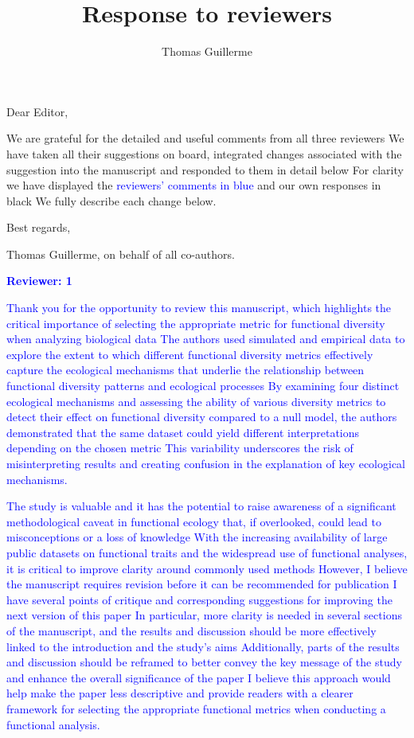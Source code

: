 \documentclass[
]{article}
\title{Response to reviewers}
\author{Thomas Guillerme}
\begin{document}
\maketitle


Dear Editor,

We are grateful for the detailed and useful comments from all three reviewers
We have taken all their suggestions on board, integrated changes associated with the suggestion into the manuscript and responded to them in detail below
For clarity we have displayed the \textcolor{blue}{reviewers' comments in blue} and our own responses in black
We fully describe each change below.

Best regards,

Thomas Guillerme, on behalf of all co-authors.

\textcolor{blue}{\textbf{Reviewer: 1}}

\textcolor{blue}{Thank you for the opportunity to review this manuscript, which highlights the critical importance of selecting the appropriate metric for functional diversity when analyzing biological data
The authors used simulated and empirical data to explore the extent to which different functional diversity metrics effectively capture the ecological mechanisms that underlie the relationship between functional diversity patterns and ecological processes
By examining four distinct ecological mechanisms and assessing the ability of various diversity metrics to detect their effect on functional diversity compared to a null model, the authors demonstrated that the same dataset could yield different interpretations depending on the chosen metric
This variability underscores the risk of misinterpreting results and creating confusion in the explanation of key ecological mechanisms.}

\textcolor{blue}{The study is valuable and it has the potential to raise awareness of a significant methodological caveat in functional ecology that, if overlooked, could lead to misconceptions or a loss of knowledge
With the increasing availability of large public datasets on functional traits and the widespread use of functional analyses, it is critical to improve clarity around commonly used methods
However, I believe the manuscript requires revision before it can be recommended for publication
I have several points of critique and corresponding suggestions for improving the next version of this paper
In particular, more clarity is needed in several sections of the manuscript, and the results and discussion should be more effectively linked to the introduction and the study's aims
Additionally, parts of the results and discussion should be reframed to better convey the key message of the study and enhance the overall significance of the paper
I believe this approach would help make the paper less descriptive and provide readers with a clearer framework for selecting the appropriate functional metrics when conducting a functional analysis.}
\end{document}
